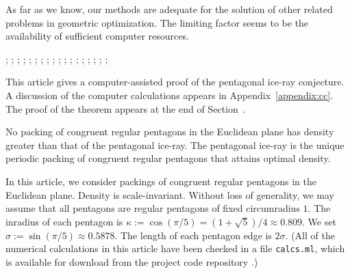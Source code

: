 As far as we know, our methods are adequate for the solution of other
related problems in geometric optimization.  The limiting factor seems
to be the availability of sufficient computer resources.


{
;  %
;  %
;  
;  %
; 
;  
;  
;  %
; 
;  
;  
;  %
;  %
; 
;  %
; 
;  
;   
}



This article gives a computer-assisted proof of the pentagonal ice-ray
conjecture.  A discussion of the computer calculations appears in
Appendix~\ref{appendix:cc}.
The proof of the theorem appears at the end of Section~.


\begin{theorem}  
  No packing of congruent regular pentagons in the Euclidean plane has
  density greater than that of the pentagonal ice-ray.  The pentagonal
  ice-ray is the unique periodic packing of congruent regular
  pentagons that attains optimal density.
\end{theorem}

In this article, we consider packings of congruent regular pentagons
in the Euclidean plane.  Density is scale-invariant.  Without loss of
generality, we may assume that all pentagons are regular pentagons of
fixed circumradius $1$.  The inradius of each pentagon is $\kappa:=
\cos (\pi/5) = (1+\sqrt{5})/4 \approx 0.809$. We set $\sigma :=
\sin(\pi/5) \approx 0.5878$.  The length of each pentagon edge is
$2\sigma$.  (All of the numerical calculations in this article have
been checked in a file {\tt calcs.ml}, which is available for download
from the project code repository \cite{Git}.)

